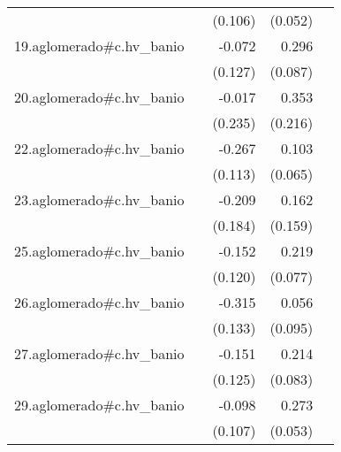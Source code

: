 {\begin{longtable}{l*{4}{D{.}{.}{-1}}}
            &                     &     (0.106)         &     (0.052)         &                     \\
\addlinespace
19.aglomerado#c.hv\_banio&                     &      -0.072         &       0.296\sym{***}&                     \\
            &                     &     (0.127)         &     (0.087)         &                     \\
\addlinespace
20.aglomerado#c.hv\_banio&                     &      -0.017         &       0.353         &                     \\
            &                     &     (0.235)         &     (0.216)         &                     \\
\addlinespace
22.aglomerado#c.hv\_banio&                     &      -0.267\sym{*}  &       0.103         &                     \\
            &                     &     (0.113)         &     (0.065)         &                     \\
\addlinespace
23.aglomerado#c.hv\_banio&                     &      -0.209         &       0.162         &                     \\
            &                     &     (0.184)         &     (0.159)         &                     \\
\addlinespace
25.aglomerado#c.hv\_banio&                     &      -0.152         &       0.219\sym{**} &                     \\
            &                     &     (0.120)         &     (0.077)         &                     \\
\addlinespace
26.aglomerado#c.hv\_banio&                     &      -0.315\sym{*}  &       0.056         &                     \\
            &                     &     (0.133)         &     (0.095)         &                     \\
\addlinespace
27.aglomerado#c.hv\_banio&                     &      -0.151         &       0.214\sym{*}  &                     \\
            &                     &     (0.125)         &     (0.083)         &                     \\
\addlinespace
29.aglomerado#c.hv\_banio&                     &      -0.098         &       0.273\sym{***}&                     \\
            &                     &     (0.107)         &     (0.053)         &                     \\

\end{longtable}}
